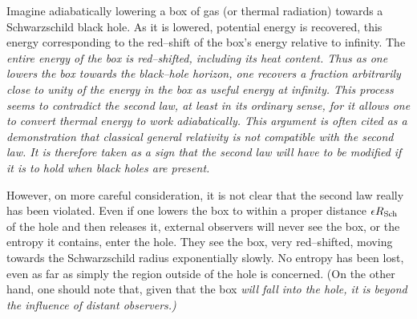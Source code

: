 Imagine adiabatically lowering a box of gas (or thermal radiation) towards a
Schwarzschild black hole.  As it is lowered, potential energy is recovered,
this energy corresponding to the red--shift of the box's energy relative to
infinity.  The \it entire \rm energy of the box is red--shifted, including its
heat content.  Thus as one lowers the box towards the black--hole horizon, one
recovers a fraction arbitrarily close to unity of the energy in the box \it as
useful energy at infinity.  \rm  This process seems to contradict the second
law, at least in its ordinary sense, for it allows one to convert thermal
energy to work adiabatically.  This argument is often cited as a demonstration
that classical general relativity is not compatible with the second law.
It is therefore taken as a sign that the second law will have to be modified if
it is to hold when black holes are present.


However, on more careful consideration, it is not clear that the second law
really has been violated.   Even if one lowers the box to within a proper
distance $\epsilon R_{\rm Sch}$ of the hole and then releases it, external
observers will never see the box, or the entropy it contains, enter the hole. 
They see the box, very red--shifted, moving towards the Schwarzschild radius
exponentially slowly. No
entropy has been lost, even as far as simply the region outside of the hole is
concerned.  (On the other hand, one should note that, given that the
box \it will \rm fall into the hole, it is beyond the influence of
distant observers.)

